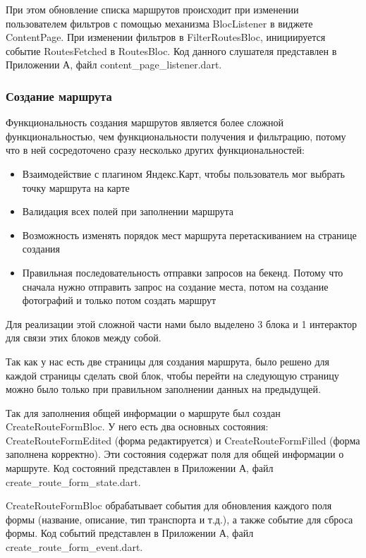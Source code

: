 При этом обновление списка маршрутов происходит при изменении пользователем фильтров с помощью механизма BlocListener в виджете ContentPage. При изменении фильтров в FilterRoutesBloc, инициируется событие RoutesFetched в RoutesBloc. Код данного слушателя представлен в Приложении А, файл content\_page\_listener.dart.

\subsubsection*{Создание маршрута}
Функциональность создания маршрутов является более сложной функциональностью, чем функциональности получения и фильтрацию, потому что в ней сосредоточено сразу несколько других функциональностей:

\begin{itemize}
    \item Взаимодействие с плагином Яндекс.Карт, чтобы пользователь мог выбрать точку маршрута на карте
    \item Валидация всех полей при заполнении маршрута
    \item Возможность изменять порядок мест маршрута перетаскиванием на странице создания
    \item Правильная последовательность отправки запросов на бекенд. Потому что сначала нужно отправить запрос на создание места, потом на создание фотографий и только потом создать маршрут
\end{itemize}

\noindent Для реализации этой сложной части нами было выделено 3 блока и 1 интерактор для связи этих блоков между собой.

Так как у нас есть две страницы для создания маршрута, было решено для каждой страницы сделать свой блок, чтобы перейти на следующую страницу можно было только при правильном заполнении данных на предыдущей. 

Так для  заполнения общей информации о маршруте был создан CreateRouteFormBloc. У него есть два основных состояния: CreateRouteFormEdited (форма редактируется) и CreateRouteFormFilled (форма заполнена корректно). Эти состояния содержат поля для общей информации о маршруте. Код состояний представлен в Приложении А, файл create\_route\_form\_state.dart.

CreateRouteFormBloc обрабатывает события для обновления каждого поля формы (название, описание, тип транспорта и т.д.), а также событие для сброса формы. Код событий представлен в Приложении А, файл create\_route\_form\_event.dart.

